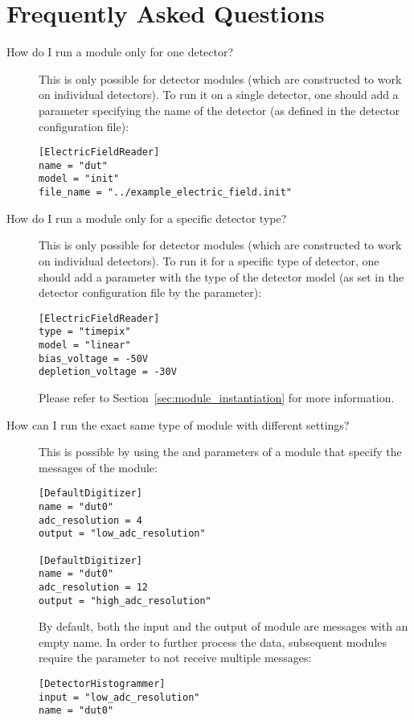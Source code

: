 \chapter{Frequently Asked Questions}
\label{ch:faq}

\begin{description}
\item[How do I run a module only for one detector?]
This is only possible for detector modules (which are constructed to work on individual detectors).
To run it on a single detector, one should add a parameter  specifying the name of the detector (as defined in the detector configuration file):
\begin{verbatim}
[ElectricFieldReader]
name = "dut"
model = "init"
file_name = "../example_electric_field.init"
\end{verbatim}
\item[How do I run a module only for a specific detector type?]
This is only possible for detector modules (which are constructed to work on individual detectors).
To run it for a specific type of detector, one should add a parameter  with the type of the detector model (as set in the detector configuration file by the  parameter):
\begin{verbatim}
[ElectricFieldReader]
type = "timepix"
model = "linear"
bias_voltage = -50V
depletion_voltage = -30V
\end{verbatim}
Please refer to Section~\ref{sec:module_instantiation} for more information.
\item[How can I run the exact same type of module with different settings?] This is possible by using the  and  parameters of a module that specify the messages of the module:
\begin{verbatim}
[DefaultDigitizer]
name = "dut0"
adc_resolution = 4
output = "low_adc_resolution"

[DefaultDigitizer]
name = "dut0"
adc_resolution = 12
output = "high_adc_resolution"
\end{verbatim}
By default, both the input and the output of module are messages with an empty name.
In order to further process the data, subsequent modules require the  parameter to not receive multiple messages:
\begin{verbatim}
[DetectorHistogrammer]
input = "low_adc_resolution"
name = "dut0"


\end{verbatim}
\end{description}
